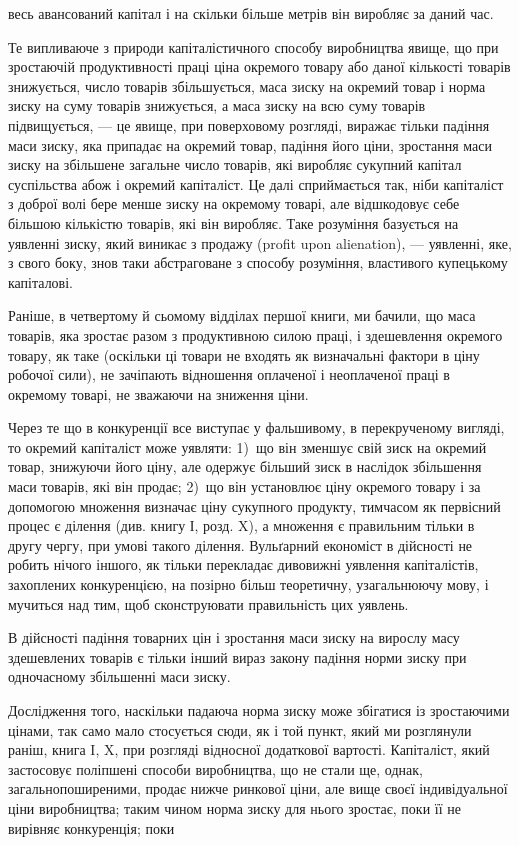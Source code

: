 \parcont{}  %
весь авансований капітал і на скільки більше метрів він виробляє за даний час.

Те випливаюче з природи капіталістичного способу виробництва явище, що при зростаючій продуктивності
праці ціна окремого товару або даної кількості товарів знижується, число товарів збільшується, маса
зиску на окремий товар і норма зиску на суму товарів знижується, а маса зиску на всю суму товарів
підвищується, — це явище, при поверховому розгляді, виражає тільки падіння маси зиску, яка припадає
на окремий товар, падіння його ціни, зростання маси зиску на збільшене загальне
число товарів, які виробляє сукупний капітал суспільства абож і окремий капіталіст. Це далі
сприймається так, ніби капіталіст з доброї волі бере менше зиску на окремому товарі, але відшкодовує
себе більшою кількістю товарів, які він виробляє. Таке розуміння базується на уявленні зиску, який
виникає з продажу (profit upon alienation), — уявленні, яке, з свого боку, знов таки абстраговане з
способу розуміння, властивого купецькому капіталові.

Раніше, в четвертому й сьомому відділах першої книги, ми бачили, що маса товарів, яка зростає разом
з продуктивною силою праці, і здешевлення окремого товару, як таке (оскільки ці товари не входять як
визначальні фактори в ціну робочої сили), не зачіпають відношення оплаченої і неоплаченої праці в
окремому товарі, не зважаючи на зниження ціни.

Через те що в конкуренції все виступає у фальшивому, в перекрученому вигляді, то окремий капіталіст
може уявляти: 1)~що він зменшує свій зиск на окремий товар, знижуючи його ціну, але одержує більший
зиск в наслідок збільшення маси товарів, які він продає; 2)~що він установлює ціну окремого товару і
за допомогою множення визначає ціну сукупного продукту, тимчасом як первісний процес є ділення (див.
книгу І, розд. X), а множення є правильним тільки в другу чергу, при умові такого ділення.
Вульґарний економіст в дійсності не робить нічого іншого, як тільки перекладає дивовижні уявлення
капіталістів, захоплених конкуренцією, на позірно більш теоретичну, узагальнюючу мову, і мучиться
над тим, щоб сконструювати правильність цих уявлень.

В дійсності падіння товарних цін і зростання маси зиску на вирослу масу здешевлених товарів є тільки
інший вираз закону падіння норми зиску при одночасному збільшенні маси зиску.

Дослідження того, наскільки падаюча норма зиску може збігатися із зростаючими цінами, так само мало
стосується сюди, як і той пункт, який ми розглянули раніш, книга I, X, при розгляді відносної
додаткової вартості. Капіталіст, який застосовує поліпшені способи виробництва, що не стали ще,
однак, загальнопоширеними, продає нижче ринкової ціни, але вище своєї індивідуальної ціни
виробництва; таким чином норма зиску для нього зростає, поки її не вирівняє конкуренція; поки
\parbreak{}  %
